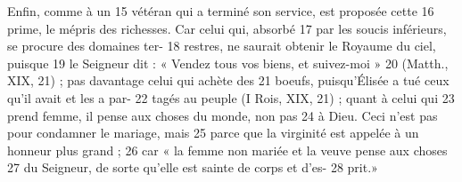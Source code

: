 Enfin, comme à un	 
15	 	vétéran qui a terminé son service, est proposée cette	 
16	 	prime, le mépris des richesses. Car celui qui, absorbé	 
17	 	par les soucis inférieurs, se procure des domaines ter-	 
18	 	restres, ne saurait obtenir le Royaume du ciel, puisque	 
19	 	le Seigneur dit : « Vendez tous vos biens, et suivez-moi »	 
20	 	(Matth., XIX, 21) ; pas davantage celui qui achète des	 
21	 	boeufs, puisqu'Élisée a tué ceux qu'il avait et les a par-	 
22	 	tagés au peuple (I Rois, XIX, 21) ; quant à celui qui	 
23	 	prend femme, il pense aux choses du monde, non pas	 
24	 	à Dieu. Ceci n'est pas pour condamner le mariage, mais	 
25	 	parce que la virginité est appelée à un honneur plus grand ;	 
26	 	car « la femme non mariée et la veuve pense aux choses	 
27	 	du Seigneur, de sorte qu'elle est sainte de corps et d'es-	 
28	 	prit.»